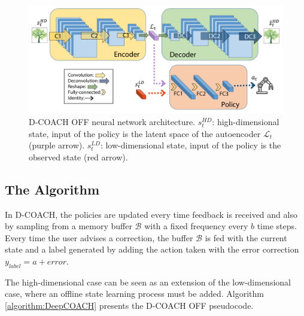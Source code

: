 \begin{figure}[h]
    \centering
    \includegraphics[width=\linewidth]{imagenes/cap2/ISER_diagram2.pdf}
    \caption[D-COACH OFF neural network architecture.]{D-COACH OFF neural network architecture. $s_{t}^{HD}$: high-dimensional state, input of the policy is the latent space of the autoencoder $\mathcal{L}_{t}$ (purple arrow). $s_{t}^{LD}$: low-dimensional state, input of the policy is the observed state (red arrow).}
    \label{fig:network_diagram}
\end{figure}

\subsection{The Algorithm}
In D-COACH, the policies are updated every time feedback is received and also by sampling from a memory buffer $\mathcal{B}$ with a fixed frequency every $b$ time steps. Every time the user advises a correction, the buffer $\mathcal{B}$ is fed with the current state and a label generated by adding the action taken with the error correction $y_{label}=a+\mathit{error}$.

The high-dimensional case can be seen as an extension of the low-dimensional case, where an offline state learning process must be added. Algorithm \ref{algorithm:DeepCOACH} presents the D-COACH OFF pseudocode.

